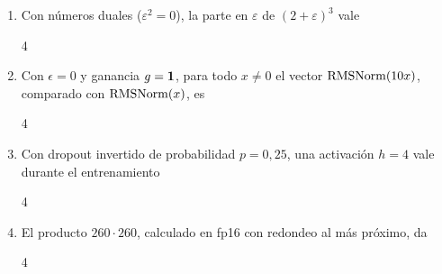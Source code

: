 \begin{enumerate}[label=\textbf{\arabic*.},leftmargin=2em,itemsep=8pt,ref=\arabic*]
\item\label{q:15}  Con números duales ($\varepsilon^{2}=0$), la parte en $\varepsilon$ de $(2+\varepsilon)^{3}$ vale
\begin{multicols}{4}
\end{multicols}

\item\label{q:16}  Con $\epsilon=0$ y ganancia $g=\mathbf{1}$, para todo $x\ne 0$ el vector $\operatorname{RMSNorm}(10x)$, comparado con $\operatorname{RMSNorm}(x)$, es
\begin{multicols}{4}
\end{multicols}

\item\label{q:17}  Con dropout invertido de probabilidad $p=0{,}25$, una activación $h=4$ vale durante el entrenamiento
\begin{multicols}{4}
\end{multicols}

\item\label{q:18}  El producto $260\cdot 260$, calculado en fp16 con redondeo al más próximo, da
\begin{multicols}{4}
\end{multicols}


\end{enumerate}
